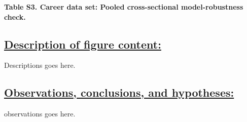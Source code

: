 \documentclass{article}\usepackage[]{graphicx}\usepackage[]{color}
\begin{document}
\begin{center}
\par{\textbf{Table S3. Career data set: Pooled cross-sectional model-robustness check.}}
\end{center}
\newpage
\subsection*{\underline{Description of figure content:}}
\par{
Descriptions goes here.
}
\subsection*{\underline{Observations, conclusions, and hypotheses:}}
\par{
observations goes here.
}
\end{document}
